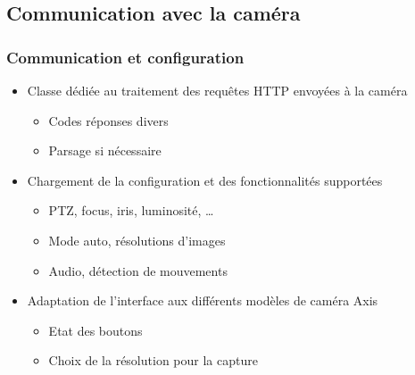 \subsection{Communication avec la caméra}
  \begin{frame}
   \frametitle{Communication et configuration}

  \begin{minipage}{0.94\textwidth}
  \centering
     \begin{itemize}
    \item Classe dédiée au traitement des requêtes HTTP envoyées à la caméra
    \begin{itemize}
      \item Codes réponses divers
      \item Parsage si nécessaire
      \newline
    \end{itemize}
    \item Chargement de la configuration et des fonctionnalités supportées
    \begin{itemize}
      \item PTZ, focus, iris, luminosité, \ldots
      \item Mode auto, résolutions d'images
      \item Audio, détection de mouvements
      \newline
    \end{itemize}
    \item Adaptation de l'interface aux différents modèles de caméra Axis
    \begin{itemize}
      \item Etat des boutons
      \item Choix de la résolution pour la capture
      \newline
    \end{itemize}
   	\end{itemize}
  \end{minipage}

  \end{frame}
